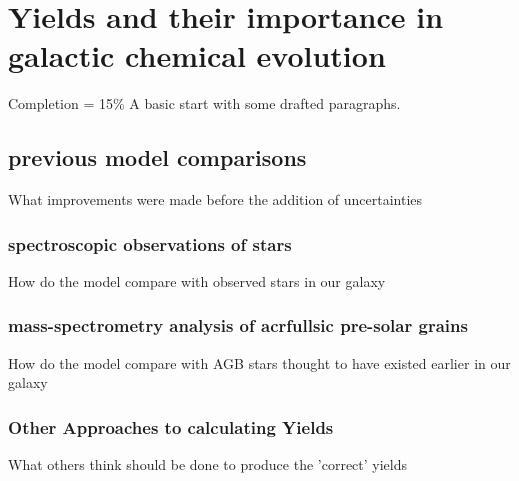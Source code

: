 \chapter{Yields and their importance in galactic chemical evolution}

Completion = 15\%
A basic start with some drafted paragraphs.

\section{previous model comparisons}

What improvements were made before the addition of uncertainties

\subsection{spectroscopic observations of stars}

How do the model compare with observed stars in our galaxy

\subsection{mass-spectrometry analysis of acrfull{sic} pre-solar grains}

How do the model compare with AGB stars thought to have existed earlier in our galaxy

\subsection{Other Approaches to calculating Yields}

What others think should be done to produce the 'correct' yields
